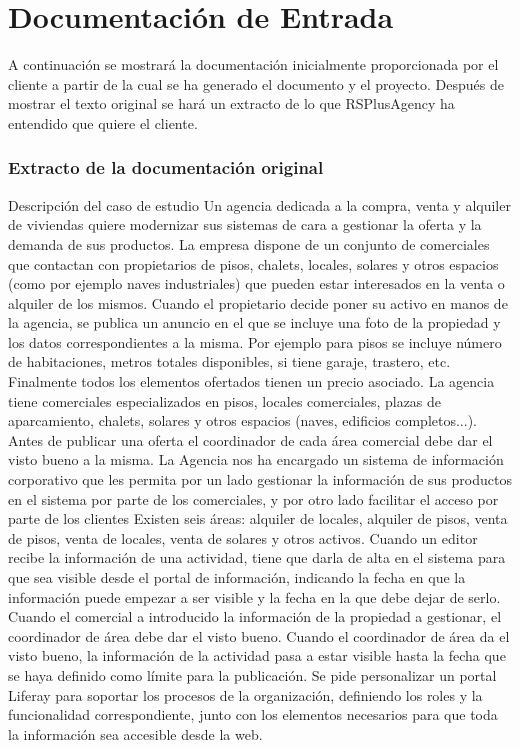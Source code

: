 \chapter{Documentación de Entrada}\label{sec:initialdocs}
\par A continuación se mostrará la documentación inicialmente proporcionada por el cliente a partir de la cual se ha generado el documento y el proyecto. Después de mostrar el texto original se hará un extracto de lo que RSPlusAgency ha entendido que quiere el cliente.
\subsection{Extracto de la documentación original}
\begin{minipage}{40em}
  Descripción del caso de estudio
Un agencia dedicada a la compra, venta y alquiler de viviendas quiere modernizar sus
sistemas de cara a gestionar la oferta y la demanda de sus productos.
La empresa dispone de un conjunto de comerciales que contactan con propietarios de
pisos, chalets, locales, solares y otros espacios (como por ejemplo naves industriales)
que pueden estar interesados en la venta o alquiler de los mismos. Cuando el
propietario decide poner su activo en manos de la agencia, se publica un anuncio en el
que se incluye una foto de la propiedad y los datos correspondientes a la misma. Por
ejemplo para pisos se incluye número de habitaciones, metros totales disponibles, si
tiene garaje, trastero, etc. Finalmente todos los elementos ofertados tienen un precio
asociado.
La agencia tiene comerciales especializados en pisos, locales comerciales, plazas de
aparcamiento, chalets, solares y otros espacios (naves, edificios completos...). Antes
de publicar una oferta el coordinador de cada área comercial debe dar el visto bueno a
la misma.
La Agencia nos ha encargado un sistema de información corporativo que les permita
por un lado gestionar la información de sus productos en el sistema por parte de los
comerciales, y por otro lado facilitar el acceso por parte de los clientes
Existen seis áreas: alquiler de locales, alquiler de pisos, venta de pisos, venta de
locales, venta de solares y otros activos. Cuando un editor recibe la información de una
actividad, tiene que darla de alta en el sistema para que sea visible desde el portal de
información, indicando la fecha en que la información puede empezar a ser visible y la
fecha en la que debe dejar de serlo.
Cuando el comercial a introducido la información de la propiedad a gestionar, el
coordinador de área debe dar el visto bueno. Cuando el coordinador de área da el
visto bueno, la información de la actividad pasa a estar visible hasta la fecha que se
haya definido como límite para la publicación.
Se pide personalizar un portal Liferay para soportar los procesos de la organización,
definiendo los roles y la funcionalidad correspondiente, junto con los elementos
necesarios para que toda la información sea accesible desde la web.


\end{minipage}
